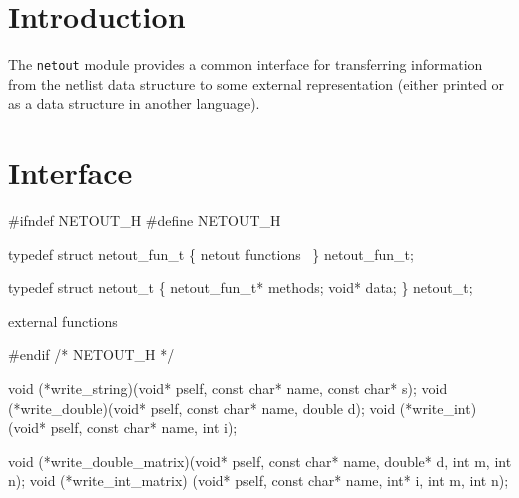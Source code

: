 
\section{Introduction}

The {\tt{}netout} module provides a common interface for transferring
information from the netlist data structure to some external
representation (either printed or as a data structure in another
language).


\section{Interface}

\endmoddef
#ifndef NETOUT_H
#define NETOUT_H

typedef struct netout_fun_t \{
    \LA{}\code{}netout\edoc{} functions~{\nwtagstyle{}}\RA{}
\} netout_fun_t;

typedef struct netout_t \{
    netout_fun_t* methods;
    void* data;
\} netout_t;

\LA{}external functions~{\nwtagstyle{}}\RA{}

#endif /* NETOUT_H */
\nwendcode{}\nwdocspar

\nwenddocs{}\endmoddef
void (*write_string)(void* pself, const char* name, const char* s);
void (*write_double)(void* pself, const char* name, double d);
void (*write_int)   (void* pself, const char* name, int i);
\nwendcode{}\nwdocspar

\nwenddocs{}\plusendmoddef
void (*write_double_matrix)(void* pself, const char* name, 
                            double* d, int m, int n);
void (*write_int_matrix)   (void* pself, const char* name, 
                            int* i, int m, int n);
\nwendcode{}\nwdocspar

